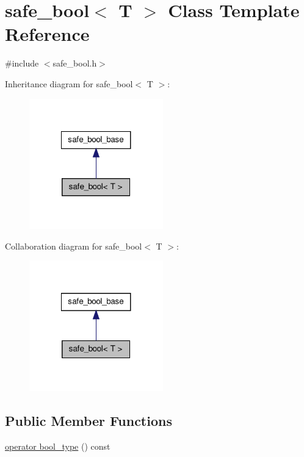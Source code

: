\hypertarget{classsafe__bool}{\section{safe\-\_\-bool$<$ T $>$ Class Template Reference}
\label{classsafe__bool}
}


{\ttfamily \#include $<$safe\-\_\-bool.\-h$>$}



Inheritance diagram for safe\-\_\-bool$<$ T $>$\-:\nopagebreak
\begin{figure}[H]
\begin{center}
\leavevmode
\includegraphics[width=164pt]{classsafe__bool__inherit__graph}
\end{center}
\end{figure}


Collaboration diagram for safe\-\_\-bool$<$ T $>$\-:\nopagebreak
\begin{figure}[H]
\begin{center}
\leavevmode
\includegraphics[width=164pt]{classsafe__bool__coll__graph}
\end{center}
\end{figure}
\subsection*{Public Member Functions}
\begin{DoxyCompactItemize}
\item 
\hyperlink{classsafe__bool_a43c6b4ac52c0d982a4c3135b1da64759}{operator bool\-\_\-type} () const 
\end{DoxyCompactItemize}
